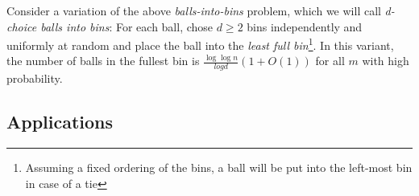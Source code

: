 \documentclass{acm_proc_article-sp}
\begin{document}
Consider a variation of the above \emph{balls-into-bins} problem, which we will call \emph{d-choice balls into bins}: For each ball, chose $d \geq 2$ bins independently and uniformly at random and place the ball into the \emph{least full bin}\footnote{Assuming a fixed ordering of the bins, a ball will be put into the left-most bin in case of a tie}. In this variant, the number of balls in the fullest bin is $\frac{\log \log n}{log d} \left( 1 + O\left(1\right)\right)$ for all $m$ with high probability.

 

\subsection{Applications}
\label{sec:applications}



 
\end{document}

